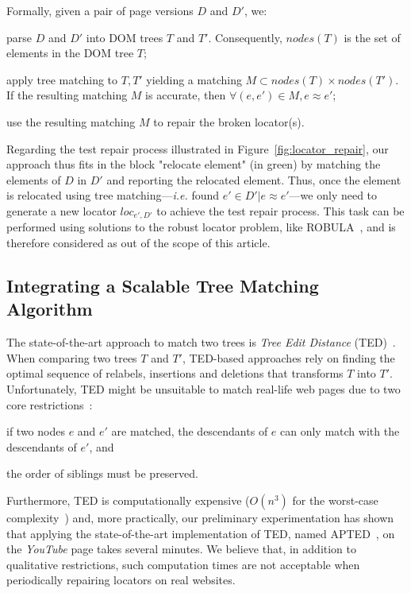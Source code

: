 Formally, given a pair of page versions $D$ and $D'$, we:
\begin{compactenum}
    \item parse $D$ and $D'$ into DOM trees $T$ and $T'$.
    Consequently, $nodes(T)$ is the set of elements in the DOM tree $T$;
    \item apply tree matching to $T, T'$ yielding a matching $M \subset nodes(T) \times nodes(T')$.
    If the resulting matching $M$ is accurate, then $\forall (e, e') \in M, e \approx e'$;
    \item use the resulting matching $M$ to repair the broken locator(s).
\end{compactenum}

Regarding the test repair process illustrated in Figure~\ref{fig:locator_repair}, our approach thus fits in the block "\textsf{relocate element}" (in green) by matching the elements of $D$ in $D'$ and reporting the relocated element. 
Thus, once the element is relocated using tree matching---\emph{i.e.} \erratum found $e' \in D'|e \approx e'$---we only need to generate a new locator $loc_{e', D'}$ to achieve the test repair process.
This task can be performed using solutions to the robust locator problem, like ROBULA~\cite{leotta2014reducing}, and is therefore considered as out of the scope of this article.

\subsection{Integrating a Scalable Tree Matching Algorithm}
The state-of-the-art approach to match two trees is \emph{Tree Edit Distance} (TED)~\cite{tai1979tree}. 
When comparing two trees $T$ and $T'$, TED-based approaches rely on finding the optimal sequence of relabels, insertions and deletions that transforms $T$ into $T'$.
Unfortunately, TED might be unsuitable to match real-life web pages due to two core restrictions~\cite{Kumar2011_FTM}:
\begin{inparaenum}
    \item if two nodes $e$ and $e'$ are matched, the descendants of $e$ can only match with the descendants of $e'$, and
    \item the order of siblings must be preserved.
\end{inparaenum}
Furthermore, TED is computationally expensive ($O(n^3)$ for the worst-case complexity~\cite{bringmann2018tree}) and, more practically, our preliminary experimentation has shown that applying the state-of-the-art implementation of TED, named APTED~\cite{pawlik2016tree}, on the \textit{YouTube} page takes several minutes. 
We believe that, in addition to qualitative restrictions, such computation times are not acceptable when periodically repairing locators on real websites.


